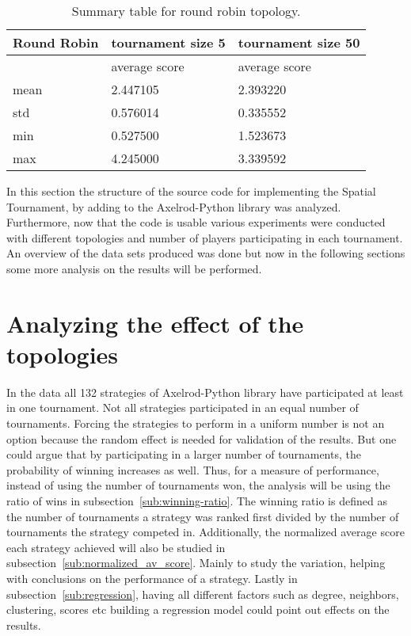 \begin{table}[H]
\centering
\begin{tabular}{|l|l|l|}
\hline
Round Robin & \multicolumn{1}{c|}{tournament size 5} & \multicolumn{1}{c|}{tournament size 50} \\ \hline

            & average score            & average score             \\ \hline
mean        & 2.447105                 & 2.393220                  \\ \hline
std         & 0.576014                 & 0.335552                  \\ \hline
min         & 0.527500                 & 1.523673                  \\ \hline
max         & 4.245000                 & 3.339592                  \\ \hline
\end{tabular}
\caption{Summary table for round robin topology.}
\label{sum-rr}
\end{table}

In this section the structure of the source code for implementing the Spatial
Tournament, by adding to the Axelrod-Python library was analyzed. Furthermore,
now that the code is usable various experiments were conducted with different
topologies
and number of players participating in each tournament. An overview of the
data sets produced was done but now in the following sections
some more analysis on the results will be performed.

\newpage
\section{Analyzing the effect of the topologies}
\label{sub:analyzing_the_effect_of_the_topologies}

In the data all 132 strategies of Axelrod-Python library have participated at
least in one tournament. Not all strategies participated in an equal
number of tournaments.
Forcing the strategies to perform in a uniform number is
not an option because the random effect is needed for validation of the
results. But one could argue that by participating in a larger number of
tournaments, the probability of winning increases as well.
Thus, for a measure of
performance, instead of using the number of tournaments won, the analysis will
be using the ratio of wins in subsection~\ref{sub:winning-ratio}.
The winning ratio is defined as the number of tournaments a strategy was ranked
first divided by the number of tournaments the strategy competed in.
Additionally, the normalized average score each strategy
achieved will also be studied in subsection~\ref{sub:normalized_av_score}. Mainly to study
the variation, helping with conclusions on the performance of a strategy.
Lastly in subsection~\ref{sub:regression}, having all different
factors such as degree, neighbors, clustering, scores etc building a regression
model could point out effects on the results.


